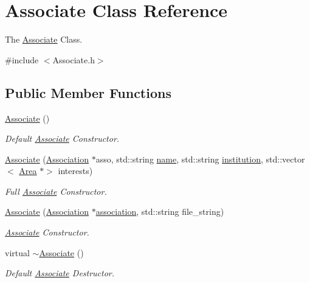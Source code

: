 \hypertarget{classAssociate}{}\section{Associate Class Reference}
\label{classAssociate}


The \hyperlink{classAssociate}{Associate} Class.  




{\ttfamily \#include $<$Associate.\+h$>$}

\subsection*{Public Member Functions}
\begin{DoxyCompactItemize}
\item 
\hyperlink{classAssociate_a624e687ad91b6311e7e493adab0a9adc}{Associate} ()
\begin{DoxyCompactList}\small\item\em Default \hyperlink{classAssociate}{Associate} Constructor. \end{DoxyCompactList}\item 
\hyperlink{classAssociate_ad27f76fd03a10e75d1b2660e60ba009f}{Associate} (\hyperlink{classAssociation}{Association} $\ast$asso, std\+::string \hyperlink{classAssociate_ad52875abacf1836cd879b7dffb88d589}{name}, std\+::string \hyperlink{classAssociate_a25b82eab07e159a91ebdc64fa4d656ab}{institution}, std\+::vector$<$ \hyperlink{classArea}{Area} $\ast$$>$ interests)
\begin{DoxyCompactList}\small\item\em Full \hyperlink{classAssociate}{Associate} Constructor. \end{DoxyCompactList}\item 
\hyperlink{classAssociate_a6265187f56438fd128bb56ad67bab04f}{Associate} (\hyperlink{classAssociation}{Association} $\ast$\hyperlink{classAssociate_a7871837a4c80adb4e39f2f67ae1bfce5}{association}, std\+::string file\+\_\+string)
\begin{DoxyCompactList}\small\item\em \hyperlink{classAssociate}{Associate} Constructor. \end{DoxyCompactList}\item 
virtual \hyperlink{classAssociate_ae7f51b6f8b7e33af9e5218a2c7319a32}{$\sim$\+Associate} ()
\begin{DoxyCompactList}\small\item\em Default \hyperlink{classAssociate}{Associate} Destructor. \end{DoxyCompactList}\item 
$$
\end{DoxyCompactItemize}
